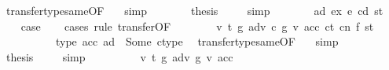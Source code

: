\begin{isabellebody}
\ transfer{\isacharunderscore}{\kern0pt}type{\isacharunderscore}{\kern0pt}same{\isacharbrackleft}{\kern0pt}OF\ {}{\isacharparenleft}{\kern0pt}{}{\isacharparenright}{\kern0pt}{\isacharbrackright}{\kern0pt}\ \isamarkupfalse%
\ simp\isanewline
\ \ \ \ \isamarkupfalse%
\ \isamarkupfalse%
\ {\isacharquery}{\kern0pt}thesis\ \isamarkupfalse%
\ {}{\isacharparenleft}{\kern0pt}{}{\isacharparenright}{\kern0pt}\ \isamarkupfalse%
\ simp\isanewline
\ \ \isamarkupfalse%
\isanewline
{}\isamarkupfalse%
\isanewline
\ \ \isamarkupfalse%
\ {\isacharparenleft}{\kern0pt}{}\ ad{\isacharprime}{\kern0pt}\ ex\ e\ cd\ st{\isacharparenright}{\kern0pt}\isanewline
\ \ \isamarkupfalse%
\ {\isacharquery}{\kern0pt}case\isanewline
\ \ \isamarkupfalse%
\ {\isacharparenleft}{\kern0pt}cases\ rule{\isacharcolon}{\kern0pt}\ transfer{\isacharbrackleft}{\kern0pt}OF\ {}{\isacharparenleft}{\kern0pt}{}{\isacharparenright}{\kern0pt}{\isacharbrackright}{\kern0pt}{\isacharparenright}{\kern0pt}\isanewline
\ \ \ \ \isamarkupfalse%
\ {\isacharparenleft}{\kern0pt}{}\ v\ t\ g\ adv\ c\ g{\isacharprime}{\kern0pt}\ v{\isacharprime}{\kern0pt}\ acc\ ct\ cn\ f\ st{\isacharprime}{\kern0pt}{\isacharprime}{\kern0pt}{\isacharparenright}{\kern0pt}\isanewline
\ \ \ \ \isamarkupfalse%
\ \isamarkupfalse%
\ {}{\isacharparenleft}{\kern0pt}{}{\isacharparenright}{\kern0pt}\ \isamarkupfalse%
\ {\isachardoublequoteopen}type\ {\isacharparenleft}{\kern0pt}acc\ ad{\isacharparenright}{\kern0pt}\ {\isacharequal}{\kern0pt}\ Some\ ctype{\isachardoublequoteclose}\ \isamarkupfalse%
\ transfer{\isacharunderscore}{\kern0pt}type{\isacharunderscore}{\kern0pt}same{\isacharbrackleft}{\kern0pt}OF\ {}{\isacharparenleft}{\kern0pt}{}{\isacharparenright}{\kern0pt}{\isacharbrackright}{\kern0pt}\ \isamarkupfalse%
\ simp\isanewline
\ \ \ \ \isamarkupfalse%
\ \isamarkupfalse%
\ {\isacharquery}{\kern0pt}thesis\ \isamarkupfalse%
\ {}{\isacharparenleft}{\kern0pt}{}{\isacharparenright}{\kern0pt}\ \isamarkupfalse%
\ simp\isanewline
\ \ \isamarkupfalse%
\isanewline
\ \ \ \ \isamarkupfalse%
\ {\isacharparenleft}{\kern0pt}{}\ v\ t\ g\ adv\ g{\isacharprime}{\kern0pt}\ v{\isacharprime}{\kern0pt}\ acc{\isacharparenright}{\kern0pt}\isanewline

\end{isabellebody}
